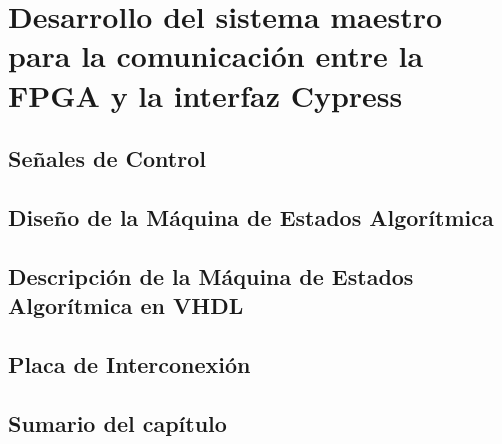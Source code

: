 \chapter{Desarrollo del sistema maestro para la comunicación entre la FPGA y la interfaz Cypress}
	\label{cap:fpga}
	
%		
	\section{Señales de Control}
		
	\section{Diseño de la Máquina de Estados Algorítmica}
		
	\section{Descripción de la Máquina de Estados Algorítmica en VHDL}
		
	\section{Placa de Interconexión}
		
	\section{Sumario del capítulo}
		